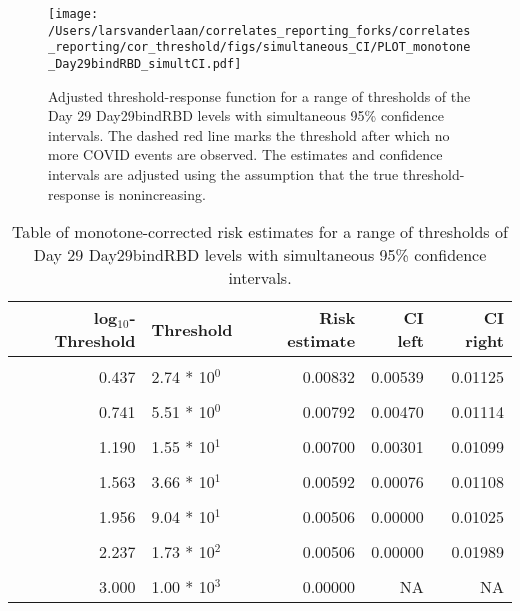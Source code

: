 \documentclass[]{article}
\begin{document}
\begin{figure}[H]
\centering
\texttt{[image: /Users/larsvanderlaan/correlates\_reporting\_forks/correlates\_reporting/cor\_threshold/figs/simultaneous\_CI/PLOT\_monotone\_Day29bindRBD\_simultCI.pdf]}
\caption{Adjusted threshold-response function for a range of thresholds of the
  Day 29 Day29bindRBD levels with simultaneous 95\% confidence intervals. The dashed red line marks the threshold after which no more COVID events are observed. The estimates and confidence intervals are adjusted using the assumption that the true threshold-response is nonincreasing.}
\end{figure}
\begin{table}[!h]

\caption{\label{tab:unnamed-chunk-47}Table of monotone-corrected risk estimates for a range of thresholds of Day 29 Day29bindRBD levels with simultaneous 95\% confidence intervals.}
\centering
\begin{tabular}[t]{rlrrr}
\toprule
log$_{10}$-Threshold & Threshold & Risk estimate & CI left & CI right\\
\midrule
\cellcolor{gray!6}{-0.099} & \cellcolor{gray!6}{7.96 * 10$^{1}$} & \cellcolor{gray!6}{0.00856} & \cellcolor{gray!6}{0.00577} & \cellcolor{gray!6}{0.01134}\\
0.437 & 2.74 * 10$^{0}$ & 0.00832 & 0.00539 & 0.01125\\
\cellcolor{gray!6}{0.585} & \cellcolor{gray!6}{3.85 * 10$^{0}$} & \cellcolor{gray!6}{0.00832} & \cellcolor{gray!6}{0.00520} & \cellcolor{gray!6}{0.01144}\\
0.741 & 5.51 * 10$^{0}$ & 0.00792 & 0.00470 & 0.01114\\
\cellcolor{gray!6}{1.000} & \cellcolor{gray!6}{1.00 * 10$^{1}$} & \cellcolor{gray!6}{0.00756} & \cellcolor{gray!6}{0.00422} & \cellcolor{gray!6}{0.01091}\\
1.190 & 1.55 * 10$^{1}$ & 0.00700 & 0.00301 & 0.01099\\
\cellcolor{gray!6}{1.371} & \cellcolor{gray!6}{2.35 * 10$^{1}$} & \cellcolor{gray!6}{0.00636} & \cellcolor{gray!6}{0.00191} & \cellcolor{gray!6}{0.01080}\\
1.563 & 3.66 * 10$^{1}$ & 0.00592 & 0.00076 & 0.01108\\
\cellcolor{gray!6}{1.852} & \cellcolor{gray!6}{7.11 * 10$^{1}$} & \cellcolor{gray!6}{0.00587} & \cellcolor{gray!6}{0.00000} & \cellcolor{gray!6}{0.01182}\\
1.956 & 9.04 * 10$^{1}$ & 0.00506 & 0.00000 & 0.01025\\
\cellcolor{gray!6}{2.083} & \cellcolor{gray!6}{1.21 * 10$^{2}$} & \cellcolor{gray!6}{0.00506} & \cellcolor{gray!6}{0.00000} & \cellcolor{gray!6}{0.01989}\\
2.237 & 1.73 * 10$^{2}$ & 0.00506 & 0.00000 & 0.01989\\
\cellcolor{gray!6}{2.699} & \cellcolor{gray!6}{5.00 * 10$^{2}$} & \cellcolor{gray!6}{0.00000} & \cellcolor{gray!6}{NA} & \cellcolor{gray!6}{NA}\\
3.000 & 1.00 * 10$^{3}$ & 0.00000 & NA & NA\\
\bottomrule
\end{tabular}
\end{table}
\end{document}
